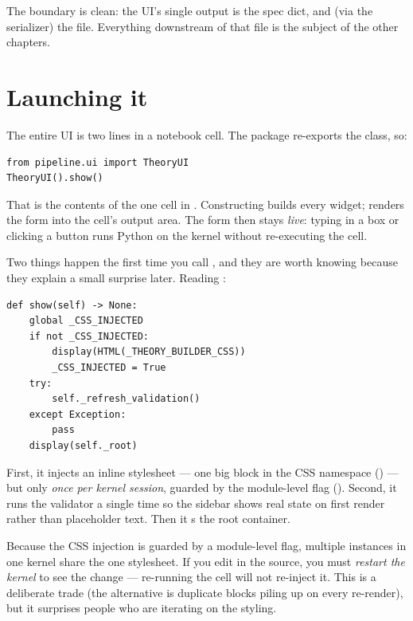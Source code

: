 The boundary is clean: the UI's single output is the spec dict, and (via the
serializer) the  file. Everything downstream of that file is the
subject of the other chapters.

\section{Launching it}

The entire UI is two lines in a notebook cell. The package
 re-exports the class, so:

\begin{lstlisting}
from pipeline.ui import TheoryUI
TheoryUI().show()
\end{lstlisting}

That is the contents of the one cell in .
Constructing  builds every widget;  renders the
form into the cell's output area. The form then stays \emph{live}: typing in a box
or clicking a button runs Python on the kernel without re-executing the cell.

Two things happen the first time you call , and they are worth
knowing because they explain a small surprise later. Reading
:

\begin{lstlisting}
def show(self) -> None:
    global _CSS_INJECTED
    if not _CSS_INJECTED:
        display(HTML(_THEORY_BUILDER_CSS))
        _CSS_INJECTED = True
    try:
        self._refresh_validation()
    except Exception:
        pass
    display(self._root)
\end{lstlisting}

First, it injects an inline stylesheet --- one big  block in the
 CSS namespace () --- but only \emph{once
per kernel session}, guarded by the module-level flag 
(). Second, it runs the validator a single time so
the sidebar shows real state on first render rather than placeholder text. Then it
s the root container.

\begin{gotcha}
Because the CSS injection is guarded by a module-level flag, multiple
 instances in one kernel share the one stylesheet. If you edit
 in the source, you must \emph{restart the kernel} to
see the change --- re-running the cell will not re-inject it. This is a deliberate
trade (the alternative is duplicate  blocks piling up on every
re-render), but it surprises people who are iterating on the styling.
\end{gotcha}

